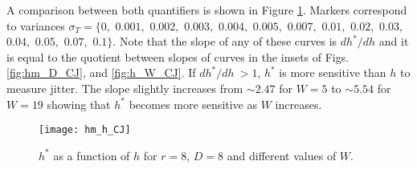 


A comparison between both quantifiers is shown in Figure \ref{fig:hm_h_CJ}. Markers correspond to variances $\sigma_T=\{0,$ $0.001,$ $0.002,$ $0.003,$ $0.004,$ $0.005,$ $0.007,$ $0.01,$ $0.02,$ $0.03,$ $0.04,$ $0.05,$ $0.07,$ $0.1\}$.
Note that the slope of any of these curves is $dh^*/dh$ and it is equal to the quotient between slopes of curves in the insets of Figs. \ref{fig:hm_D_CJ}, and \ref{fig:h_W_CJ}. If $dh^*/dh~>1$, $h^*$ is more sensitive than $h$ to measure jitter. The slope slightly increases from $\sim2.47$ for $W=5$ to $\sim5.54$ for $W=19$ showing that $h^*$ becomes more sensitive as $W$ increases.

\begin{figure}
\center
\texttt{[image: hm\_h\_CJ]}
\caption{$h^*$ as a function of $h$ for $r=8$, $D=8$ and different values of $W$.}
\label{fig:hm_h_CJ}
\end{figure}


